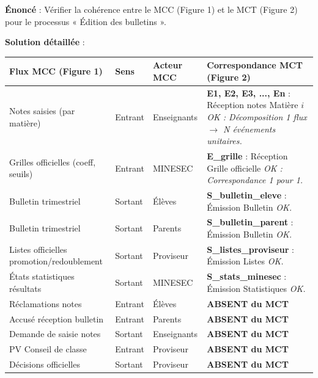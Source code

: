\documentclass[11pt]{article}
\begin{document}
\begin{exoresolu}
\textbf{Énoncé} : Vérifier la cohérence entre le MCC (Figure 1) et le MCT (Figure 2) pour le processus « Édition des bulletins ».

\textbf{Solution détaillée} :

\begin{center}
\begin{tabularx}{\linewidth}{|l|l|l|X|}
\hline
\rowcolor{popblueL}
\textbf{Flux MCC (Figure 1)} & \textbf{Sens} & \textbf{Acteur MCC} & \textbf{Correspondance MCT (Figure 2)} \\ \hline
Notes saisies (par matière) & Entrant & Enseignants & \textbf{E1, E2, E3, ..., En} : Réception notes Matière $i$ \newline \textit{OK : Décomposition 1 flux $\rightarrow$ N événements unitaires.} \\ \hline
Grilles officielles (coeff, seuils) & Entrant & MINESEC & \textbf{E\_grille} : Réception Grille officielle \newline \textit{OK : Correspondance 1 pour 1.} \\ \hline
Bulletin trimestriel & Sortant & Élèves & \textbf{S\_bulletin\_eleve} : Émission Bulletin \newline \textit{OK.} \\ \hline
Bulletin trimestriel & Sortant & Parents & \textbf{S\_bulletin\_parent} : Émission Bulletin \newline \textit{OK.} \\ \hline
Listes officielles promotion/redoublement & Sortant & Proviseur & \textbf{S\_listes\_proviseur} : Émission Listes \newline \textit{OK.} \\ \hline
États statistiques résultats & Sortant & MINESEC & \textbf{S\_stats\_minesec} : Émission Statistiques \newline \textit{OK.} \\ \hline
Réclamations notes & Entrant & Élèves & \textbf{ABSENT du MCT} \\ \hline
Accusé réception bulletin & Entrant & Parents & \textbf{ABSENT du MCT} \\ \hline
Demande de saisie notes & Sortant & Enseignants & \textbf{ABSENT du MCT} \\ \hline
PV Conseil de classe & Entrant & Proviseur & \textbf{ABSENT du MCT} \\ \hline
Décisions officielles & Sortant & Proviseur & \textbf{ABSENT du MCT} \\ \hline
\end{tabularx}
\end{center}


\end{exoresolu}
\end{document}
